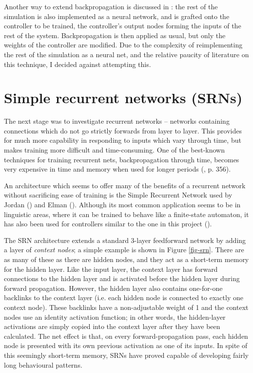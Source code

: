 \documentclass[a4paper]{report}
\begin{document}
Another way to extend backpropagation is discussed in \cite{widrow88}:
the rest of the simulation is also implemented as a neural network,
and is grafted onto the controller to be trained, the controller's
output nodes forming the inputs of the rest of the system.
Backpropagation is then applied as usual, but only the weights of the
controller are modified. Due to the complexity of reimplementing the
rest of the simulation as a neural net, and the relative paucity of
literature on this technique, I decided against attempting this.

\section{Simple recurrent networks (SRNs)}

The next stage was to investigate recurrent networks -- networks
containing connections which do not go strictly forwards from layer to
layer. This provides for much more capability in responding to inputs
which vary through time, but makes training more difficult and
time-consuming. One of the best-known techniques for training
recurrent nets, backpropagation through time, becomes very expensive
in time and memory when used for longer periods (\cite{rumelhart86},
p. 356).

An architecture which seems to offer many of the benefits of a
recurrent network without sacrificing ease of training is the Simple
Recurrent Network used by Jordan (\cite{jordan86}) and Elman
(\cite{elman90}). Although its most common application seems to be in
linguistic areas, where it can be trained to behave like a
finite-state automaton, it has also been used for controllers similar
to the one in this project (\cite{meeden96}).

The SRN architecture extends a standard 3-layer feedforward network by
adding a layer of \emph{context nodes}; a simple example is shown in
Figure \ref{fig-srn}. There are as many of these as there are hidden
nodes, and they act as a short-term memory for the hidden layer. Like
the input layer, the context layer has forward connections to the
hidden layer and is activated before the hidden layer during forward
propagation. However, the hidden layer also contains one-for-one
backlinks to the context layer (i.e. each hidden node is connected to
exactly one context node). These backlinks have a non-adjustable
weight of 1 and the context nodes use an identity activation function;
in other words, the hidden-layer activations are simply copied into
the context layer after they have been calculated.  The net effect is
that, on every forward-propagation pass, each hidden node is presented
with its own previous activation as one of its inputs. In spite of
this seemingly short-term memory, SRNs have proved capable of
developing fairly long behavioural patterns.
\end{document}
